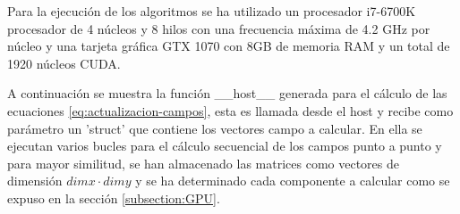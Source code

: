 \documentclass[11pt,a4paper,twoside,pdf]{article}
\numberwithin{equation}{section}
\begin{document}


Para la ejecución de los algoritmos se ha utilizado un procesador i7-6700K procesador de 4 núcleos y 8 hilos con una frecuencia máxima de 4.2 GHz por núcleo y una tarjeta gráfica GTX 1070 con 8GB de memoria RAM y un total de 1920 núcleos CUDA. 

A continuación se muestra la función \_\_host\_\_ generada para el cálculo de las ecuaciones \ref{eq:actualizacion-campos}, esta es llamada desde el host y recibe como parámetro un 'struct' que contiene los vectores campo a calcular. En ella se ejecutan varios bucles para el cálculo secuencial de los campos punto a punto y para mayor similitud, se han almacenado las matrices como vectores de dimensión $dimx\cdot dimy$ y se ha determinado cada componente a calcular como se expuso en la sección \ref{subsection:GPU}. 
\end{document}
